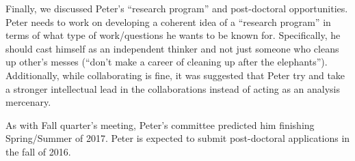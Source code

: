 \documentclass{article}
\begin{document}
Finally, we discussed Peter's ``research program'' and post-doctoral opportunities. Peter needs to work on developing a coherent idea of a ``research program'' in terms of what type of work/questions he wants to be known for. Specifically, he should cast himself as an independent thinker and not just someone who cleans up other's messes (``don't make a career of cleaning up after the elephants''). Additionally, while collaborating is fine, it was suggested that Peter try and take a stronger intellectual lead in the collaborations instead of acting as an analysis mercenary.

As with Fall quarter's meeting, Peter's committee predicted him finishing Spring/Summer of 2017. Peter is expected to submit post-doctoral applications in the fall of 2016.
\end{document}

